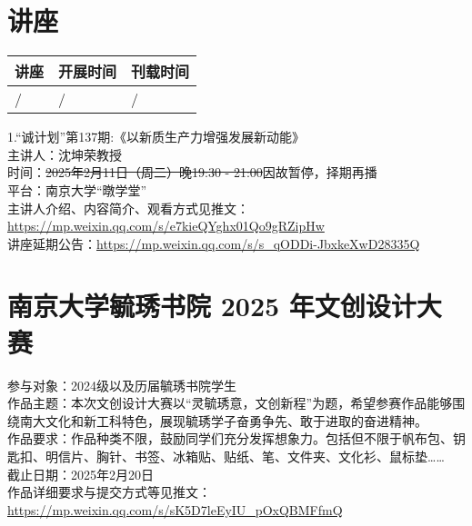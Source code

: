 \documentclass[letterpaper, 12pt]{article}
\begin{document}
\begin{multicols}{2}

\section{讲座}
\begin{tabularx}{0.5\textwidth}{|X|X|X|}
    \hline
    讲座 & 开展时间 & 刊载时间\\
    \hline\hline
/ & / & /\\\hline
\end{tabularx}

1.“诚计划”第137期:《以新质生产力增强发展新动能》\\
主讲人：沈坤荣教授 \\
时间：\sout{2025年2月11日（周二）晚19:30 - 21:00}因故暂停，择期再播\\
平台：南京大学“暾学堂”\\
主讲人介绍、内容简介、观看方式见推文：\url{https://mp.weixin.qq.com/s/e7kieQYghx01Qo9gRZipHw}\\
讲座延期公告：\url{https://mp.weixin.qq.com/s/s_qODDi-JbxkeXwD28335Q}




\section{南京大学毓琇书院 2025 年文创设计大赛}
参与对象：2024级以及历届毓琇书院学生\\
作品主题：本次文创设计大赛以“灵毓琇意，文创新程”为题，希望参赛作品能够围绕南大文化和新工科特色，展现毓琇学子奋勇争先、敢于进取的奋进精神。\\
作品要求：作品种类不限，鼓励同学们充分发挥想象力。包括但不限于帆布包、钥匙扣、明信片、胸针、书签、冰箱贴、贴纸、笔、文件夹、文化衫、鼠标垫……\\
截止日期：2025年2月20日\\
作品详细要求与提交方式等见推文：\url{https://mp.weixin.qq.com/s/sK5D7leEyIU_pOxQBMFfmQ}\\




\end{multicols}
\end{document}
